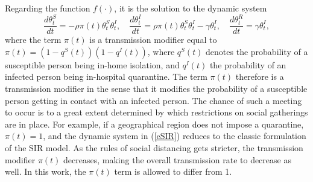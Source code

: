 \documentclass[10pt,a4paper]{article}
\begin{document}
Regarding the function $f(\cdot)$, it is the solution to the dynamic system
%
\begin{equation}\label{eSIR}
	\frac{d\theta_t^S}{dt} = -\rho\pi(t)\theta_t^S\theta_t^I, \quad \frac{d\theta_t^I}{dt} = \rho\pi(t)\theta_t^S\theta_t^I - \gamma \theta_t^I, \quad \frac{d\theta_t^R}{dt} = \gamma \theta_t^I,
\end{equation}
%
where the term $\pi(t)$ is a transmission modifier equal to $\pi(t) = (1-q^S(t))(1-q^I(t))$, where $q^S(t)$ denotes the probability of a susceptible person being in-home isolation, and $q^I(t)$ the probability of an infected person being in-hospital quarantine. The term $\pi(t)$ therefore is a transmission modifier in the sense that it modifies the probability of a susceptible person getting in contact with an infected person. The chance of such a meeting to occur is to a great extent determined by which restrictions on social gatherings are in place. For example, if a geographical region does not impose a quarantine, $\pi(t)=1$, and the dynamic system in (\ref{eSIR}) reduces to the classic formulation of the SIR model. As the rules of social distancing gets stricter, the transmission modifier $\pi(t)$ decreases, making the overall transmission rate to decrease as well. In this work, the $\pi(t)$ term is allowed to differ from 1. 
\end{document}
